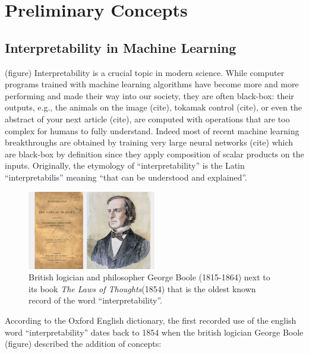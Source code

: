 \chapter*{Preliminary Concepts}
\section{Interpretability in Machine Learning} 
(figure)
Interpretability is a crucial topic in modern science. While computer programs trained with machine learning algorithms have become more and more performing and made their way into our society, they are often black-box: their outputs, e.g., the animals on the image (cite), tokamak control (cite), or even the abstract of your next article (cite), are computed with operations that are too complex for humans to fully understand.
Indeed most of recent machine learning breakthroughs are obtained by training very large neural networks (cite) which are black-box by definition since they apply composition of scalar products on the inputs.
Originally, the etymology of ``interpretability'' is the Latin ``interpretabilis'' meaning ``that can be understood and explained''.

\begin{figure}
    \centering
    \includegraphics[width=0.5\textwidth]{images/images_intro/gboole.jpg}
    \caption{British logician and philosopher George Boole (1815-1864) next to its book \textit{The Laws of Thoughts}(1854) that is the oldest known record of the word ``interpretability''.}
\end{figure}
According to the Oxford English dictionary, the first recorded use of the english word ``interpretability'' dates back to 1854 when the british logician George Boole (figure) described the addition of concepts:

